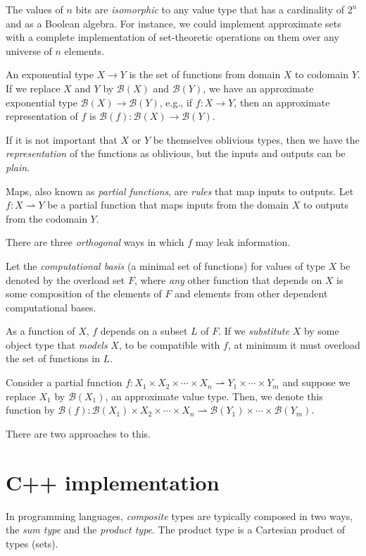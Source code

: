 \documentclass[11pt,final,hidelinks]{article}
\newcommand{\Ber}[1]{\mathcal{B}(#1)}  %
\theoremstyle{plain}
\begin{document}
The values of $n$ bits are \emph{isomorphic} to any value type that has a cardinality of $2^n$ and as a Boolean algebra.
For instance, we could implement approximate sets with a complete implementation of set-theoretic operations on them over any universe of $n$ elements.

An exponential type $X \to Y$ is the set of functions from domain $X$ to codomain $Y$. If we replace $X$ and $Y$ by $\Ber{X}$ and $\Ber{Y}$, we have an approximate exponential type $\Ber{X} \to \Ber{Y}$, e.g., if $f : X \to Y$, then an approximate representation of $f$ is $\Ber{f} : \Ber{X} \to \Ber{Y}$.

If it is not important that $X$ or $Y$ be themselves oblivious types, then we have the \emph{representation} of the functions as oblivious, but the inputs and outputs can be \emph{plain}.

Maps, also known as \emph{partial functions}, are \emph{rules} that map inputs to outputs.
Let $f : X \rightharpoonup Y$ be a partial function that maps inputs from the domain $X$ to outputs from the codomain $Y$.

There are three \emph{orthogonal} ways in which $f$ may leak information.

Let the \emph{computational basis} (a minimal set of functions) for values of type $X$ be denoted by the overload set $F$, where \emph{any} other function that depends on $X$ is some composition of the elements of $F$ and elements from other dependent computational bases.

As a function of $X$, $f$ depends on a subset $L$ of $F$.
If we \emph{substitute} $X$ by some object type that \emph{models} $X$, to be compatible with $f$, at minimum it must overload the set of functions in $L$.

Consider a partial function $f : X_1 \times X_2 \times \cdots \times X_n \rightharpoonup Y_1 \times \cdots \times Y_m$ and suppose we replace $X_1$ by $\Ber{X_1}$, an approximate value type.
Then, we denote this function by $\Ber{f} : \Ber{X_1} \times X_2 \times \cdots \times X_n \rightharpoonup \Ber{Y_1} \times \cdots \times \Ber{Y_m}$.

There are two approaches to this.

\section{C++ implementation}
\label{sec:implementation}

In programming languages, \emph{composite} types are typically composed in two ways, the \emph{sum type} and the \emph{product type}.
The product type is a Cartesian product of types (sets).
\end{document}
